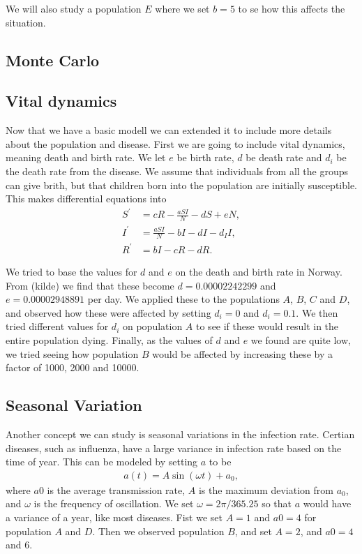 \documentclass[a4paper]{article}
\let\Oldsubsection\subsection
\renewcommand{\subsection}{\FloatBarrier\Oldsubsection}
\begin{document}
We will also study a population $E$ where we set $b=5$ to se how this affects the situation. 


\subsection{Monte Carlo}



\subsection{Vital dynamics}

Now that we have a basic modell we can extended it to include more details about the population and disease. First we are going to include vital dynamics, meaning death and birth rate. We let $e$ be birth rate, $d$ be death rate and $d_i$ be the death rate from the disease. We assume that individuals from all the groups can give brith, but that children born into the population are initially susceptible. This makes differential equations into 
\begin{align} 
S ^ { \prime } & = c R - \frac { a S I } { N } - d S + e N, \\ 
I ^ { \prime } & = \frac { a S I } { N } - b I - d I - d _ { I } I, \\ 
R ^ { \prime } & = b I - c R - d R.
\end{align}

We tried to base the values for $d$ and $e$ on the death and birth rate in Norway. From (kilde) we find that these become $d=0.00002242299$ and $e=0.00002948891$ per day. We applied these to the populations $A$, $B$, $C$ and $D$, and observed how these were affected by setting $d_i=0$ and $d_i=0.1$. We then tried different values for $d_i$ on population $A$ to see if these would result in the entire population dying. Finally, as the values of $d$ and $e$ we found are quite low, we tried seeing how population $B$ would be affected by increasing these by a factor of 1000, 2000 and 10000. 


\subsection{Seasonal Variation}

Another concept we can study is seasonal variations in the infection rate. Certian diseases, such as influenza, have a large variance in infection rate based on the time of year. This can be modeled by setting $a$ to be
\begin{align}
a ( t ) = A \sin ( \omega t ) + a _ { 0 },
\end{align}
where $a0$ is the average transmission rate, $A$ is the maximum deviation from $a_0$, and $\omega$ is the frequency of oscillation. We set $\omega = 2 \pi/365.25$ so that $a$ would have a variance of a year, like most diseases. Fist we set $A=1$ and $a0=4$ for population $A$ and $D$. Then we observed population $B$, and set $A=2$, and $a0=4$ and $6$. 
\end{document}
